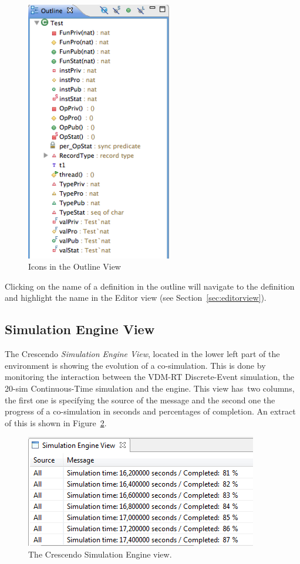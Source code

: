 \documentclass{crescendorepchap}
\begin{document}
\begin{figure}[!htb]
\begin{center}
  \includegraphics[width=2.5in]{images/OutlineIcons}
  \caption[labelInTOC]{Icons in the Outline View}
  \label{fig:OutlineIcons}
\end{center}
\end{figure}

Clicking on the name of a definition in the outline will navigate to
the definition and highlight the name in the Editor view (see Section~\ref{sec:editorview}).

\subsection{Simulation Engine View}

The Crescendo \emph{Simulation Engine View}, located in the lower left part of the
environment is showing the evolution of a co-simulation. This is done by
monitoring the interaction between the VDM-RT Discrete-Event simulation,
the 20-sim Continuous-Time simulation and the engine. This view has~two
columns, the first one is specifying the source of the message and the
second one the progress of a co-simulation in seconds and percentages of completion.
An extract of this is shown in Figure~\ref{fig:engineview}.

\begin{figure}[htbp]
\centering
\includegraphics[width=.6\textwidth]{images/DestecsEngineView.png}
\caption{The Crescendo Simulation Engine view.\label{fig:engineview}}
\end{figure}
\end{document}
